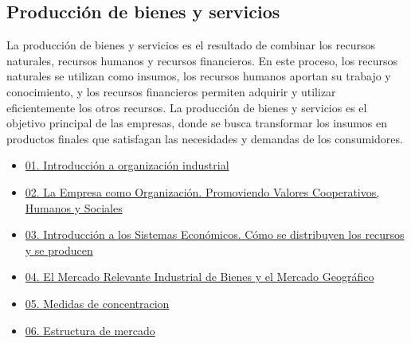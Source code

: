 \documentclass[
  a4paper,
]{article}
\begin{document}
\hypertarget{producciuxf3n-de-bienes-y-servicios}{%
\subsection{Producción de bienes y
servicios}\label{producciuxf3n-de-bienes-y-servicios}}

La producción de bienes y servicios es el resultado de combinar los
recursos naturales, recursos humanos y recursos financieros. En este
proceso, los recursos naturales se utilizan como insumos, los recursos
humanos aportan su trabajo y conocimiento, y los recursos financieros
permiten adquirir y utilizar eficientemente los otros recursos. La
producción de bienes y servicios es el objetivo principal de las
empresas, donde se busca transformar los insumos en productos finales
que satisfagan las necesidades y demandas de los consumidores.

\begin{itemize}
\item
  \href{../2023-06-12-introducion-organizacion-industrial-oi-cap1/index.qmd}{01.
  Introducción a organización industrial}
\item
  \href{../2023-06-13-empresa-como-organizacion-oi-cap1/index.qmd}{02.
  La Empresa como Organización. Promoviendo Valores Cooperativos,
  Humanos y Sociales}
\item
  \href{../2023-06-13-sistemas-economicos-oi.cap1/index.qmd}{03.
  Introducción a los Sistemas Económicos. Cómo se distribuyen los
  recursos y se producen}
\item
  \href{../2023-06-15-mercado-relevante-oi-cap2/index.qmd}{04. El
  Mercado Relevante Industrial de Bienes y el Mercado Geográfico}
\item
  \href{../2023-06-16-concentracion-poder-oi-cap3/index.qmd}{05. Medidas
  de concentracion}
\item
  \href{../2023-06-17-estructura-mercado-oi-cap4/index.qmd}{06.
  Estructura de mercado}
\end{itemize}


\printbibliography
\end{document}
